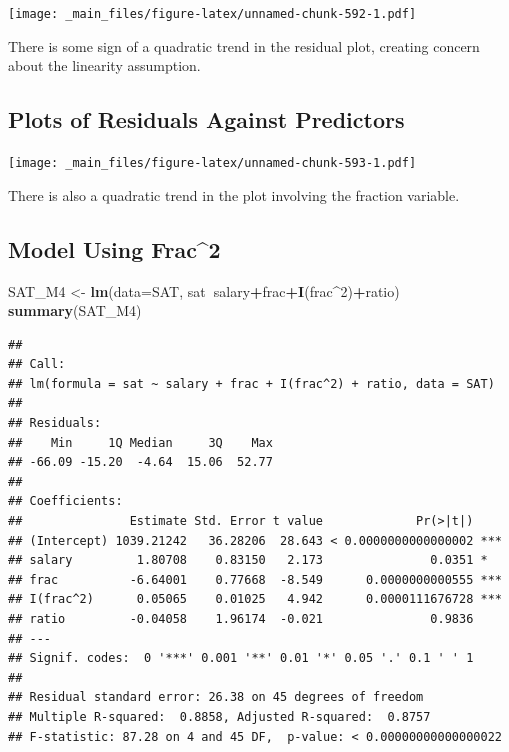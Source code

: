 \documentclass[]{book}
\newenvironment{Shaded}{\begin{snugshade}}{\end{snugshade}}
\newcommand{\KeywordTok}[1]{\textcolor[rgb]{0.13,0.29,0.53}{\textbf{#1}}}
\newcommand{\DataTypeTok}[1]{\textcolor[rgb]{0.13,0.29,0.53}{#1}}
\newcommand{\DecValTok}[1]{\textcolor[rgb]{0.00,0.00,0.81}{#1}}
\newcommand{\StringTok}[1]{\textcolor[rgb]{0.31,0.60,0.02}{#1}}
\newcommand{\OperatorTok}[1]{\textcolor[rgb]{0.81,0.36,0.00}{\textbf{#1}}}
\newcommand{\NormalTok}[1]{#1}
\begin{document}
\texttt{[image: \_main\_files/figure-latex/unnamed-chunk-592-1.pdf]}

There is some sign of a quadratic trend in the residual plot, creating
concern about the linearity assumption.

\subsection{Plots of Residuals Against
Predictors}\label{plots-of-residuals-against-predictors}

\texttt{[image: \_main\_files/figure-latex/unnamed-chunk-593-1.pdf]}

There is also a quadratic trend in the plot involving the fraction
variable.

\subsection{Model Using Frac\^{}2}\label{model-using-frac2}

\begin{Shaded}
\begin{Highlighting}[]
\NormalTok{SAT_M4 <-}\StringTok{ }\KeywordTok{lm}\NormalTok{(}\DataTypeTok{data=}\NormalTok{SAT, sat}\OperatorTok{~}\NormalTok{salary}\OperatorTok{+}\NormalTok{frac}\OperatorTok{+}\KeywordTok{I}\NormalTok{(frac}\OperatorTok{^}\DecValTok{2}\NormalTok{)}\OperatorTok{+}\NormalTok{ratio)}
\KeywordTok{summary}\NormalTok{(SAT_M4)}
\end{Highlighting}
\end{Shaded}

\begin{verbatim}
## 
## Call:
## lm(formula = sat ~ salary + frac + I(frac^2) + ratio, data = SAT)
## 
## Residuals:
##    Min     1Q Median     3Q    Max 
## -66.09 -15.20  -4.64  15.06  52.77 
## 
## Coefficients:
##               Estimate Std. Error t value             Pr(>|t|)    
## (Intercept) 1039.21242   36.28206  28.643 < 0.0000000000000002 ***
## salary         1.80708    0.83150   2.173               0.0351 *  
## frac          -6.64001    0.77668  -8.549      0.0000000000555 ***
## I(frac^2)      0.05065    0.01025   4.942      0.0000111676728 ***
## ratio         -0.04058    1.96174  -0.021               0.9836    
## ---
## Signif. codes:  0 '***' 0.001 '**' 0.01 '*' 0.05 '.' 0.1 ' ' 1
## 
## Residual standard error: 26.38 on 45 degrees of freedom
## Multiple R-squared:  0.8858, Adjusted R-squared:  0.8757 
## F-statistic: 87.28 on 4 and 45 DF,  p-value: < 0.00000000000000022
\end{verbatim}
\end{document}
